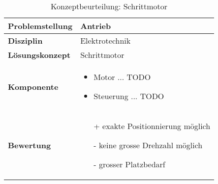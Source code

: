 \documentclass[../../main.tex]{subfiles}
\begin{document}
    \begin{flushleft}
        \begin{table}[H]
        \begin{tabular}{ | l | p{11cm} |}
        \hline
        \textbf{Problemstellung} & Antrieb \\ \hline
        \textbf{Disziplin} & Elektrotechnik \\ \hline
        \textbf{Lösungskonzept} & Schrittmotor\\ \hline
        \textbf{Komponente} & \begin{itemize}
            \item Motor ... TODO
            \item Steuerung ... TODO
            \end{itemize}\\ \hline
        \textbf{Bewertung} &  \begin{itemize} 
                                \item[+] exakte Positionnierung möglich
                                \item[-] keine grosse Drehzahl möglich
                                \item[-] grosser Platzbedarf
                              \end{itemize} \\ \hline
        \end{tabular}
        \caption{Konzeptbeurteilung: Schrittmotor}
        \label{tab:antr_konzept_schrittmotor}
    \end{table}
    \end{flushleft}
    
    
\end{document}

